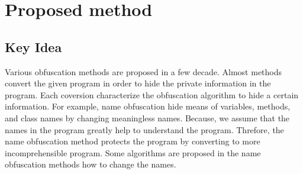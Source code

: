 \documentclass[conference]{IEEEtran}
\begin{document}
% 

\section{Proposed method}

\subsection{Key Idea}

Various obfuscation methods are proposed in a few decade.  Almost
methods convert the given program in order to hide the private
information in the program.  Each coversion characterize the
obfuscation algorithm to hide a certain information.
%
For example, name obfuscation hide means of variables, methods, and
class names by changing meaningless names\cite{tyma00patent}.
Because, we assume that the names in the program greatly help to
understand the program.  Threfore, the name obfuscation method
protects the program by converting to more incomprehensible program.
Some algorithms are proposed in the name obfuscation methods how to
change the names.
\end{document}
